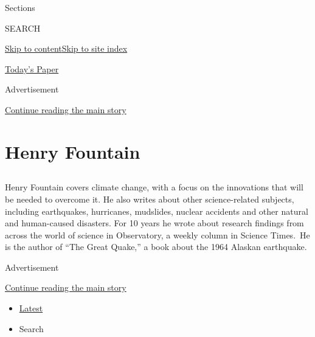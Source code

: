 Sections

SEARCH

\protect\hyperlink{site-content}{Skip to
content}\protect\hyperlink{site-index}{Skip to site index}

\href{https://myaccount.nytimes3xbfgragh.onion/auth/login?response_type=cookie\&client_id=vi}{}

\href{https://www.nytimes3xbfgragh.onion/section/todayspaper}{Today's
Paper}

Advertisement

\protect\hyperlink{after-top}{Continue reading the main story}

\hypertarget{henry-fountain}{%
\section{Henry Fountain}\label{henry-fountain}}

\subsection{}

Henry Fountain covers climate change, with a focus on the innovations
that will be needed to overcome it. He also writes about other
science-related subjects, including earthquakes, hurricanes, mudslides,
nuclear accidents and other natural and human-caused disasters. For 10
years he wrote about research findings from across the world of science
in Observatory, a weekly column in Science Times.~He is the author of
``The Great Quake,'' a book about the 1964 Alaskan earthquake.

Advertisement

\protect\hyperlink{after-mid1}{Continue reading the main story}

\begin{itemize}
\tightlist
\item
  \protect\hyperlink{stream-panel}{Latest}
\item
  Search
\end{itemize}

